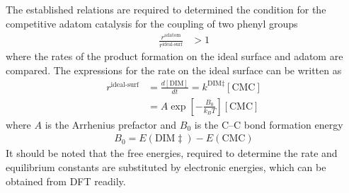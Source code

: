 \documentclass[journal=jpclcd,layout=traditional,manuscript=letter]{achemso} %
\begin{document}


The established relations are required to determined the condition for the competitive adatom catalysis for the coupling of two phenyl groups 
%
\begin{equation} \label{eq:compete}
\begin{split}
\frac{r^{\text{adatom}} }{ r^{\text{ideal-surf}} } &> 1
\end{split}
\end{equation}
%
where the rates of the product formation on the ideal surface and adatom are compared. The expressions for the rate on the ideal surface can be written as
%
\begin{equation}
\begin{split}
r^{\text{ideal-surf}} &= \frac{d[\text{DIM}]}{dt} = k^{\text{DIM}\ddagger} [\text{CMC}]   \\
&= A \exp\left[ -\frac{B_0}{k_B T} \right] [\text{CMC}] 
\end{split}
\end{equation}
%
where $A$ is the Arrhenius prefactor and $B_0$ is the C--C bond formation energy
%
\begin{equation}
\begin{split}
B_0 = E(\text{DIM}\ddagger) - E(\text{CMC}) 
\end{split}
\end{equation}
%
It should be noted that the free energies, required to determine the rate and equilibrium constants are substituted by electronic energies, which can be obtained from DFT readily.
\end{document}
